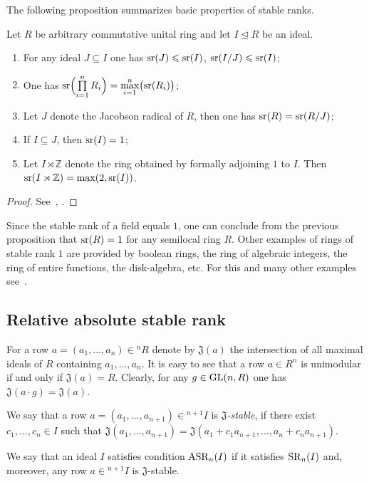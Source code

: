 The following proposition summarizes basic properties of stable ranks.
\begin{prop} \label{prop:sr_properties}
Let $R$ be arbitrary commutative unital ring and let $I\trianglelefteq R$ be an ideal.
\begin{enumerate}
\item For any ideal $J\subseteq I$ one has $\operatorname{sr}(J)\leqslant\operatorname{sr}(I)$, $\operatorname{sr}(I/J)\leqslant\operatorname{sr}(I)$;
\item One has $\operatorname{sr}\Bigl(\prod\limits_{i=1}^n R_i\Bigr)=\max\limits_{i=1}^n\bigl(\operatorname{sr}(R_i)\bigr)$;
\item Let $J$ denote the Jacobson radical of $R$, then one has $\operatorname{sr}(R)=\operatorname{sr}(R/J)$;
\item If $I\subseteq J$, then $\operatorname{sr}(I)=1$;
\item Let $I\rtimes\mathbb{Z}$ denote the ring obtained by formally adjoining $1$ to $I$. Then $\operatorname{sr}(I\rtimes\mathbb{Z})=\max(2,\operatorname{sr}(I))$.
\end{enumerate}
\end{prop}
\begin{proof} See~\cite[Theorem~2.3]{Va69}, \cite{Va71}. 
\end{proof}
\begin{example}
Since the stable rank of a field equals $1$, one can conclude from the previous proposition that $\operatorname{sr}(R)=1$ for any semilocal ring $R$.
Other examples of rings of stable rank $1$ are provided by boolean rings, the ring of algebraic integers, the ring of entire functions, the disk-algebra, etc. For this and many other examples see~\cite{VasSR1}.

\end{example}

\subsection{Relative absolute stable rank}\label{sec:rel-asr}
For a row $a=(a_1,\ldots,a_n)\in{}^n\!R$ denote by $\mathfrak{J}(a)$ the intersection of all maximal ideals of $R$ containing $a_1,\ldots,a_n$.
It is easy to see that a row $a\in R^n$ is unimodular if and only if $\mathfrak{J}(a)=R$. 
Clearly, for any $g\in\operatorname{GL}(n,R)$ one has $\mathfrak{J}(a\cdot g)=\mathfrak{J}(a)$.
\begin{dfn}\label{dfn:j-stable}
We say that a row $a=(a_1,\ldots,a_{n+1})\in{}^{n+1}\!I$ is {\it $\mathfrak{J}$-stable}, if there exist $c_1,\ldots,c_n\in I$ such that
$\mathfrak{J}(a_1,\ldots,a_{n+1})=\mathfrak{J}(a_1+c_1a_{n+1},\ldots,a_n+c_na_{n+1}).$
\end{dfn}
\begin{dfn}\label{dfn:asr}
We say that an ideal $I$ satisfies condition $\operatorname{ASR}_n(I)$ if it satisfies $\operatorname{SR}_n(I)$ and, moreover, any row $a\in{}^{n+1}\!I$ is $\mathfrak{J}$-stable.
\end{dfn}

